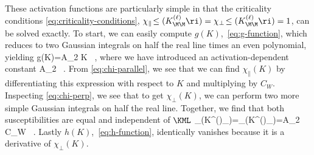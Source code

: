 These activation functions are particularly simple in that the criticality conditions \eqref{eq:criticality-conditions},  $\chi_\parallel\!\le(K^{(\ell)}_{\M\M}\ri)=\chi_\perp\!\le(K^{(\ell)}_{\M\M}\ri)=1$, can be solved exactly.
To start, 
we can easily compute $g(K)$,~\eqref{eq:g-function}, which reduces to two Gaussian integrals on half the real line times an even polynomial, yielding %
\be\label{eq:needed-to-recall-in-kernel-learning-chapter-I}
g(K)=A_2 K \, , 
\ee
where we have introduced an activation-dependent constant
\be
A_2\equiv {} \, .
\ee
From \eqref{eq:chi-parallel}, we see that we can find $\chi_\parallel(K)$ by differentiating this expression with respect to $K$ and multiplying by $C_W$. Inspecting \eqref{eq:chi-perp}, we see that to get  $\chi_\perp(K)$, we can perform two more simple Gaussian integrals on half the real line.
Together, we find that both susceptibilities are equal and independent of $\KML$
\be\label{eq:needed-to-recall-in-kernel-learning-chapter-II}
\chi_\parallel\!\le(K^{(\ell)}_{\M\M}\ri)=\chi_\perp\!\le(K^{(\ell)}_{\M\M}\ri)=A_2 C_W \equiv\chi \, .
\ee
Lastly $h(K)$,~\eqref{eq:h-function}, identically vanishes because it is a derivative of $\chi_\perp(K)$.

